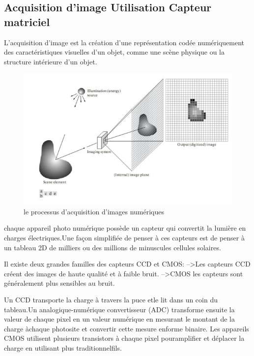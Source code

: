 \documentclass[12pt,a4paper]{report}
\numberwithin{equation}{subsection}
\numberwithin{equation}{section}
\begin{document}
\subsection{Acquisition d'image Utilisation  Capteur matriciel}
L'acquisition d'image est la création d'une représentation codée numériquement des caractéristiques visuelles d'un objet,
 comme une scène physique ou la structure intérieure d'un objet.
\newline
\begin{figure}[h!]
    \centering
    \includegraphics[width=.9\textwidth]{m.jpg}
   
     \caption{le processus d'acquisition d'images numériques}
\end{figure}
\newline
chaque appareil photo numérique possède un capteur qui convertit la lumière en charges électriques.Une façon simplifiée de penser à ces capteurs est de penser à un tableau 2D de milliers ou des millions de minuscules cellules solaires.
\newline

Il existe deux grandes familles des capteurs CCD et CMOS:\newline
-->Les capteurs CCD créent des images de haute qualité et à faible bruit.\newline
-->CMOS les capteurs sont généralement plus sensibles au bruit.
\newline

Un CCD transporte la charge à travers la puce etle lit dans un coin du tableau.Un analogique-numérique convertisseur (ADC) transforme 
ensuite la valeur de chaque pixel en un valeur numérique en mesurant le montant de la charge àchaque photosite et convertir cette mesure enforme binaire.\newline
Les appareils CMOS utilisent plusieurs transistors à chaque pixel pouramplifier et déplacer la charge en utilisant plus traditionnelfils.
\end{document}
